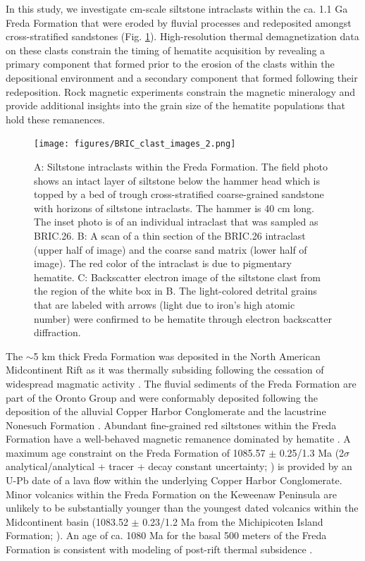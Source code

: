 \documentclass[draft]{agujournal2018}
\begin{document}
In this study, we investigate cm-scale siltstone intraclasts within the ca. 1.1 Ga Freda Formation that were eroded by fluvial processes and redeposited amongst cross-stratified sandstones (Fig. \ref{fig:intraclast_images}). High-resolution thermal demagnetization data on these clasts constrain the timing of hematite acquisition by revealing a primary component that formed prior to the erosion of the clasts within the depositional environment and a secondary component that formed following their redeposition. Rock magnetic experiments constrain the magnetic mineralogy and provide additional insights into the grain size of the hematite populations that hold these remanences.

\begin{figure}[!ht]
\centering
\noindent\texttt{[image: figures/BRIC\_clast\_images\_2.png]}
\caption{\small{A: Siltstone intraclasts within the Freda Formation. The field photo shows an intact layer of siltstone below the hammer head which is topped by a bed of trough cross-stratified coarse-grained sandstone with horizons of siltstone intraclasts. The hammer is 40 cm long. The inset photo is of an individual intraclast that was sampled as BRIC.26. B: A scan of a thin section of the BRIC.26 intraclast (upper half of image) and the coarse sand matrix (lower half of image). The red color of the intraclast is due to pigmentary hematite. C: Backscatter electron image of the siltstone clast from the region of the white box in B. The light-colored detrital grains that are labeled with arrows (light due to iron's high atomic number) were confirmed to be hematite through electron backscatter diffraction.}}
\label{fig:intraclast_images}
\end{figure}

The $\sim$5 km thick Freda Formation was deposited in the North American Midcontinent Rift as it was thermally subsiding following the cessation of widespread magmatic activity \citep{Cannon1992b}. The fluvial sediments of the Freda Formation are part of the Oronto Group and were conformably deposited following the deposition of the alluvial Copper Harbor Conglomerate and the lacustrine Nonesuch Formation \citep{Ojakangas2001a, Slotznick2018b}.  Abundant fine-grained red siltstones within the Freda Formation have a well-behaved magnetic remanence dominated by hematite \citep{Henry1977a}. A maximum age constraint on the Freda Formation of 1085.57 $\pm$ 0.25/1.3 Ma (2$\sigma$ analytical/analytical + tracer + decay constant uncertainty; \citealp{Fairchild2017a}) is provided by an U-Pb date of a lava flow within the underlying Copper Harbor Conglomerate. Minor volcanics within the Freda Formation on the Keweenaw Peninsula are unlikely to be substantially younger than the youngest dated volcanics within the Midcontinent basin (1083.52 $\pm$ 0.23/1.2 Ma from the Michipicoten Island Formation; \citealp{Fairchild2017a}). An age of ca. 1080 Ma for the basal 500 meters of the Freda Formation is consistent with modeling of post-rift thermal subsidence \citep{Hutchinson1990a}.
\end{document}

